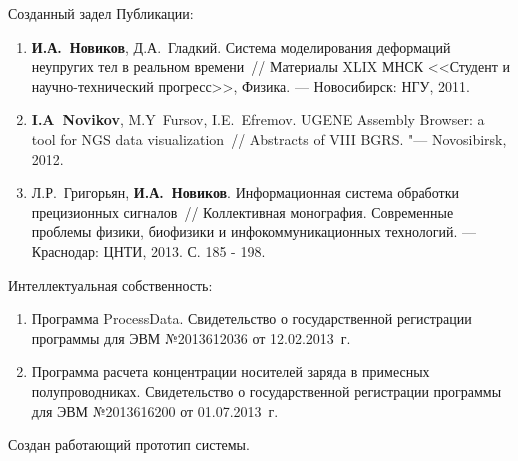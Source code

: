 \documentclass[usenames,dvipsnames,pdftex,unicode,hidelinks]{beamer}
\begin{document}
  \begin{frame}{Созданный задел}
    Публикации:
    {
      \scriptsize
      \begin{enumerate}
        \item
          \textbf{И.А.~Новиков}, Д.А.~Гладкий. Система моделирования деформаций неупругих тел в реальном времени~//
          Материалы XLIX МНСК <<Студент и научно-технический прогресс>>, Физика. --- Новосибирск:
          НГУ, 2011.
        \item
          \textbf{I.A~Novikov}, M.Y~Fursov, I.E.~Efremov. UGENE Assembly Browser: a tool for NGS data
          visualization~// Abstracts of VIII BGRS. "--- Novosibirsk, 2012.
        \item
          Л.Р.~Григорьян, \textbf{И.А.~Новиков}. Информационная система обработки прецизионных сигналов~//
          Коллективная монография. Современные проблемы физики, биофизики и инфокоммуникационных технологий.
          --- Краснодар: ЦНТИ, 2013. С. 185 - 198.
      \end{enumerate}
    }
    Интеллектуальная собственность:
    {
      \scriptsize
      \begin{enumerate}
        \item
          Программа ProcessData. Свидетельство о государственной регистрации программы
          для ЭВМ №2013612036 от 12.02.2013~г.
        \item
          Программа расчета концентрации носителей заряда в примесных полупроводниках.
          Свидетельство о государственной регистрации программы для ЭВМ №2013616200 от 01.07.2013~г.
      \end{enumerate}
    }
    Создан работающий прототип системы.
  \end{frame}
\end{document}
